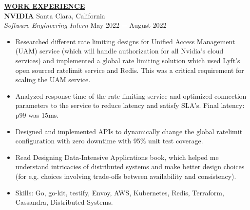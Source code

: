 \documentclass{article}
\begin{document}
% 
%
\noindent \textbf{\underline{WORK EXPERIENCE}} \\
\noindent \textbf{NVIDIA} \hfill Santa Clara, California\\
\textit{Software Engineering Intern} \hfill May 2022 $-$ August 2022
\begin{itemize}[noitemsep,nolistsep,leftmargin=*]
	\item Researched different rate limiting designs for Unified Access Management (UAM) service (which will handle authorization for all Nvidia's cloud services) and implemented a global rate limiting solution which used Lyft's open sourced ratelimit service and Redis. This was a critical requirement for scaling the UAM service. 
	\item Analyzed response time of the rate limiting service and optimized connection parameters to the service to reduce latency and satisfy SLA's. Final latency: p99 was 15ms.
	\item Designed and implemented APIs to dynamically change the global ratelimit configuration with zero downtime with 95\% unit test coverage.
	\item Read Designing Data-Intensive Applications book, which helped me understand intricacies of distributed systems and make better design choices (for e.g. choices involving trade-offs between availability and consistency).
	\item Skills: Go, go-kit, testify, Envoy, AWS, Kubernetes, Redis, Terraform, Cassandra, Distributed Systems. \\
\end{itemize}
\end{document}
